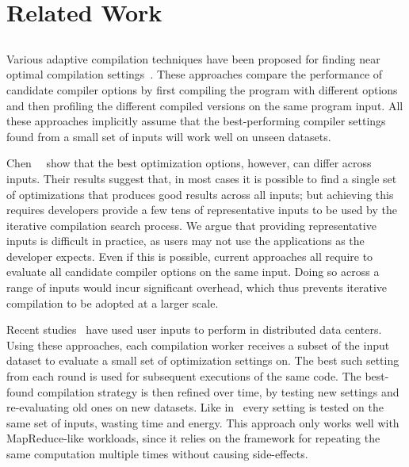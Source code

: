 \section{Related Work}\label{sec:relatedwork}

\subsection{{\IterComp}}
Various adaptive compilation techniques have been proposed for finding near optimal compilation 
settings~\cite{agakov06,kulkarni04,stephenson03,hoste08}. These approaches compare the performance of candidate compiler options by first
compiling the program with different options and then profiling the different compiled versions on the same program input. All these
approaches implicitly assume that the best-performing compiler settings found from a small set of inputs will work well on unseen datasets.

Chen~\etal~\cite{chen10,chen12a} show that the best optimization options, however, can differ across inputs. Their results suggest that, in
most cases it is possible to find a single set of optimizations that produces good results across all inputs; but achieving this requires
developers provide a few tens of representative inputs to be used by the iterative compilation search process. We argue that providing
representative inputs is difficult in practice, as users may not use the applications as the developer expects. Even if this is possible,
current approaches all require to evaluate all candidate compiler options on the same input. Doing so across a range of inputs would incur
significant overhead, which thus prevents iterative compilation to be adopted at a larger scale.

Recent studies~\cite{chen12b,fang15} have used user inputs to perform {\itercomp} in distributed data centers. Using these approaches, each
compilation worker receives a subset of the input dataset to evaluate a small set of optimization settings on. The best such setting from
each round is used for subsequent executions of the same code. The best-found compilation strategy is then refined over time, by testing
new settings and re-evaluating old ones on new datasets. Like in~\cite{chen10} every setting is tested on the same set of inputs, wasting
time and energy. This approach only works well with MapReduce-like workloads, since it relies on the framework for repeating the same
computation multiple times without causing side-effects.

